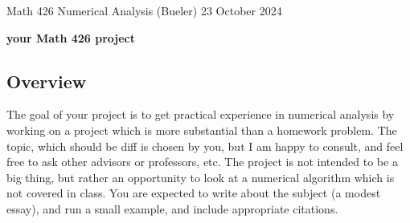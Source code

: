 \documentclass[11pt]{amsart}
\begin{document}
\scriptsize \noindent Math 426 Numerical Analysis (Bueler) \hfill 23 October 2024
\bigskip

\Large\centerline{\textbf{your Math 426 project}}
\normalsize

\thispagestyle{empty}

\bigskip

\subsection*{Overview}  The goal of your project is to get practical experience in numerical analysis by working on a project which is more substantial than a homework problem.  The topic, which should be diff is chosen by you, but I am happy to consult, and feel free to ask other advisors or professors, etc.  The project is not intended to be a big thing, but rather an opportunity to look at a numerical algorithm which is not covered in class.  You are expected to write about the subject (a modest essay), and run a small example, and include appropriate citations.
\end{document}
